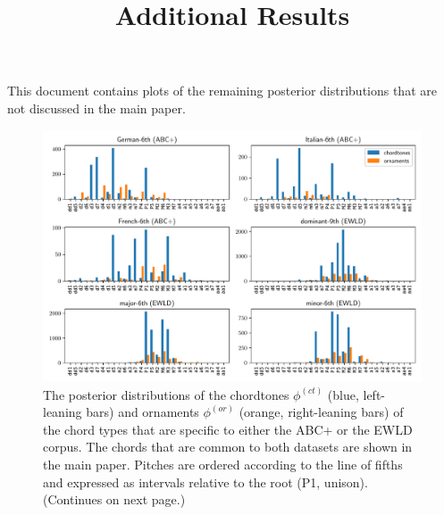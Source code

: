 \documentclass[a4]{scrartcl}
\title{Additional Results}
\begin{document}
\maketitle

\noindent
This document contains plots of the remaining posterior distributions that are not discussed in the main paper.

\begin{figure}[h]
  \centering
  \includegraphics[width=\textwidth]{plots/chordtypes_rest1.pdf}
  \caption[The posterior distributions of the chordtones $\phi^{(ct)}$ and ornaments $\phi^{(or)}$
    of the chord types that are specific to either the ABC+ or the EWLD corpus.]{
    The posterior distributions of the chordtones $\phi^{(ct)}$ (blue, left-leaning bars)
    and ornaments $\phi^{(or)}$ (orange, right-leaning bars)
    of the chord types that are specific to either the ABC+ or the EWLD corpus.
    The chords that are common to both datasets are shown in the main paper.
    Pitches are ordered according to the line of fifths
    and expressed as intervals relative to the root (P1, unison).
    (Continues on next page.)
  }
  \label{fig:harmonies-ornaments.profiles-rest}
\end{figure}%
\end{document}
